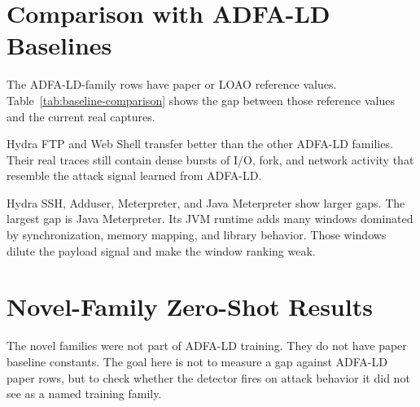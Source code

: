 \documentclass[11pt,a4paper]{article}
\begin{document}
\section{Comparison with ADFA-LD Baselines}

The ADFA-LD-family rows have paper or LOAO reference values. Table~\ref{tab:baseline-comparison} shows the gap between those reference values and the current real captures.

\begin{table}[htbp]
\centering
\caption{ADFA-LD-family comparison. Delta is Real AUC minus Paper AUC.}
\label{tab:baseline-comparison}
\end{table}

Hydra FTP and Web Shell transfer better than the other ADFA-LD families. Their real traces still contain dense bursts of I/O, fork, and network activity that resemble the attack signal learned from ADFA-LD.

Hydra SSH, Adduser, Meterpreter, and Java Meterpreter show larger gaps. The largest gap is Java Meterpreter. Its JVM runtime adds many windows dominated by synchronization, memory mapping, and library behavior. Those windows dilute the payload signal and make the window ranking weak.

\section{Novel-Family Zero-Shot Results}

The novel families were not part of ADFA-LD training. They do not have paper baseline constants. The goal here is not to measure a gap against ADFA-LD paper rows, but to check whether the detector fires on attack behavior it did not see as a named training family.
\end{document}
